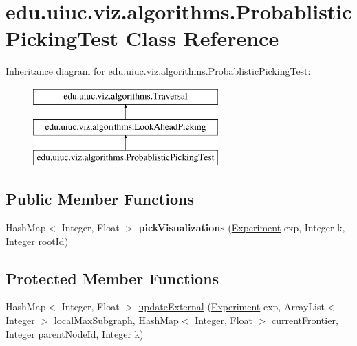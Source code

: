 \hypertarget{classedu_1_1uiuc_1_1viz_1_1algorithms_1_1_probablistic_picking_test}{}\section{edu.\+uiuc.\+viz.\+algorithms.\+Probablistic\+Picking\+Test Class Reference}
\label{classedu_1_1uiuc_1_1viz_1_1algorithms_1_1_probablistic_picking_test}
Inheritance diagram for edu.\+uiuc.\+viz.\+algorithms.\+Probablistic\+Picking\+Test\+:\begin{figure}[H]
\begin{center}
\leavevmode
\includegraphics[height=3.000000cm]{classedu_1_1uiuc_1_1viz_1_1algorithms_1_1_probablistic_picking_test}
\end{center}
\end{figure}
\subsection*{Public Member Functions}
\begin{DoxyCompactItemize}
\item 
\mbox{\label{classedu_1_1uiuc_1_1viz_1_1algorithms_1_1_probablistic_picking_test_a71f8f1a44b8cdca792e0644df08eb4a2}} 
Hash\+Map$<$ Integer, Float $>$ {\bfseries pick\+Visualizations} (\mbox{\hyperlink{classedu_1_1uiuc_1_1viz_1_1algorithms_1_1_experiment}{Experiment}} exp, Integer k, Integer root\+Id)
\end{DoxyCompactItemize}
\subsection*{Protected Member Functions}
\begin{DoxyCompactItemize}
\item 
Hash\+Map$<$ Integer, Float $>$ \mbox{\hyperlink{classedu_1_1uiuc_1_1viz_1_1algorithms_1_1_probablistic_picking_test_a96642cd7cc4fbd22725028d61e3919b1}{update\+External}} (\mbox{\hyperlink{classedu_1_1uiuc_1_1viz_1_1algorithms_1_1_experiment}{Experiment}} exp, Array\+List$<$ Integer $>$ local\+Max\+Subgraph, Hash\+Map$<$ Integer, Float $>$ current\+Frontier, Integer parent\+Node\+Id, Integer k)
\end{DoxyCompactItemize}
